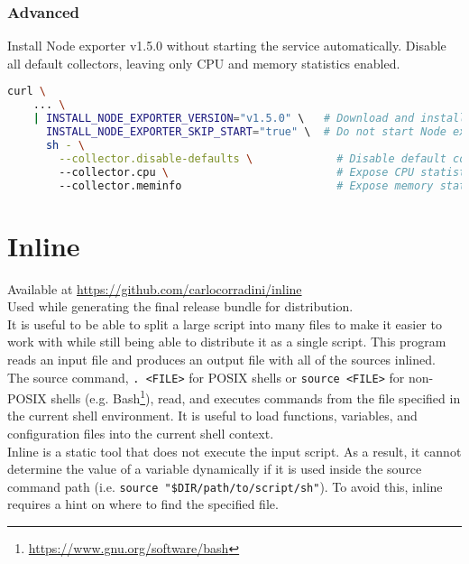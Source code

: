\subsubsection{Advanced}
\label{subsubsec:projects_node_exporter_installer_example_advanced}

Install Node exporter v1.5.0 without starting the service automatically. Disable
all default collectors, leaving only CPU and memory statistics enabled.

\begin{lstlisting}[language=sh, morekeywords={curl, sh}, caption=Advanced installation with custom configuration parameters]
  curl \
    ... \
    | INSTALL_NODE_EXPORTER_VERSION="v1.5.0" \   # Download and install Node exporter v1.5.0
      INSTALL_NODE_EXPORTER_SKIP_START="true" \  # Do not start Node exporter service
      sh - \
        --collector.disable-defaults \             # Disable default collectors
        --collector.cpu \                          # Expose CPU statistics
        --collector.meminfo                        # Expose memory statistics
\end{lstlisting}

\section{Inline}
\label{sec:projects_inline}

Available at \url{https://github.com/carlocorradini/inline} \\ %
Used while generating the final release bundle for distribution. \\ %
It is useful to be able to split a large script into many files to make it
easier to work with while still being able to distribute it as a single script. This
program reads an input file and produces an output file with all of the sources inlined.
\\ %
The source command, \texttt{.\ <FILE>} for POSIX shells or \texttt{source <FILE>}
for non-POSIX shells (e.g. Bash\footnote{\url{https://www.gnu.org/software/bash}}),
read, and executes commands from the file specified in the current shell environment.
It is useful to load functions, variables, and configuration files into the
current shell context\cite{source}. \\ %
Inline is a static tool that does not execute the input script. As a result, it cannot
determine the value of a variable dynamically if it is used inside the source command
path (i.e. \texttt{source "\$DIR/path/to/script/sh"}). To avoid this, inline
requires a hint on where to find the specified file.

